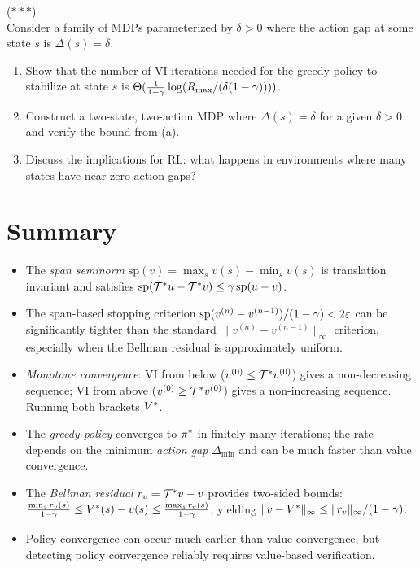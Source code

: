 \documentclass[11pt,a4paper]{article}
\begin{document}
\begin{exercise}
\textnormal{(\(***\))} \\
Consider a family of MDPs parameterized by $\delta > 0$ where the
action gap at some state $s$ is $\Delta(s) = \delta$.
\begin{enumerate}[label=(\alph*)]
    \item Show that the number of VI iterations needed for the greedy
    policy to stabilize at state $s$ is
    $\Theta(\frac{1}{1-\gamma} \log(R_{\max}/(\delta(1-\gamma))))$.
    \item Construct a two-state, two-action MDP where
    $\Delta(s) = \delta$ for a given $\delta > 0$ and verify the
    bound from (a).
    \item Discuss the implications for RL: what happens in
    environments where many states have near-zero action gaps?
\end{enumerate}
\end{exercise}


\section{Summary}
\label{sec:summary}

\begin{itemize}
    \item The \emph{span seminorm}
    $\mathrm{sp}(v) = \max_s v(s) - \min_s v(s)$ is translation
    invariant and satisfies
    $\mathrm{sp}(\mathcal{T}^* u - \mathcal{T}^* v) \leq
    \gamma\, \mathrm{sp}(u - v)$.
    \item The span-based stopping criterion
    $\mathrm{sp}(v^{(n)} - v^{(n-1)})/(1-\gamma) < 2\varepsilon$
    can be significantly tighter than the standard
    $\|v^{(n)} - v^{(n-1)}\|_\infty$ criterion, especially when the
    Bellman residual is approximately uniform.
    \item \emph{Monotone convergence}: VI from below
    ($v^{(0)} \leq \mathcal{T}^* v^{(0)}$) gives a non-decreasing
    sequence; VI from above ($v^{(0)} \geq \mathcal{T}^* v^{(0)}$)
    gives a non-increasing sequence. Running both brackets $V^*$.
    \item The \emph{greedy policy} converges to $\pi^*$ in
    finitely many iterations; the rate depends on the minimum
    \emph{action gap} $\Delta_{\min}$ and can be much faster than
    value convergence.
    \item The \emph{Bellman residual} $r_v = \mathcal{T}^* v - v$
    provides two-sided bounds:
    $\frac{\min_s r_v(s)}{1-\gamma} \leq V^*(s) - v(s) \leq
    \frac{\max_s r_v(s)}{1-\gamma}$, yielding
    $\|v - V^*\|_\infty \leq \|r_v\|_\infty/(1-\gamma)$.
    \item Policy convergence can occur much earlier than value
    convergence, but detecting policy convergence reliably requires
    value-based verification.
\end{itemize}
\end{document}
